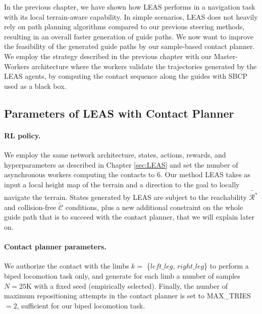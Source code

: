 In the previous chapter, we have shown how LEAS performs in a navigation task with its local terrain-aware capability.
In simple scenarios, LEAS does not heavily rely on path planning algorithms compared to our previous steering methods, resulting in an overall faster generation of guide paths.
We now want to improve the feasibility of the generated guide paths by our sample-based contact planner.
We employ the strategy described in the previous chapter with our Master-Workers architecture where the workers validate the trajectories generated by the LEAS agents, by computing the contact sequence along the guides with SBCP used as a black box.

\subsection{Parameters of LEAS with Contact Planner}
\paragraph{RL policy.}
We employ the same network architecture, states, actions, rewards, and hyperparameters as described in Chapter \ref{sec:LEAS} and set the number of asynchronous workers computing the contacts to 6.
Our method LEAS takes as input a local height map of the terrain and a direction to the goal to locally navigate the terrain. 
States generated by LEAS are subject to the reachability $\tilde{\mathcal{R}^*}$ and collision-free $\tilde{\mathcal{C}}$ conditions, plus a new additional constraint on the whole guide path that is to succeed with the contact planner, that we will explain later on.

\paragraph{Contact planner parameters.}
We authorize the contact with the limbs $k=$ \{$left\_leg$, $right\_leg$\} to perform a biped locomotion task only, and generate for each limb a number of samples $N=25$K with a fixed seed (empirically selected). Finally, the number of maximum repositioning attempts in the contact planner is set to MAX\_TRIES $=2$, sufficient for our biped locomotion task.

